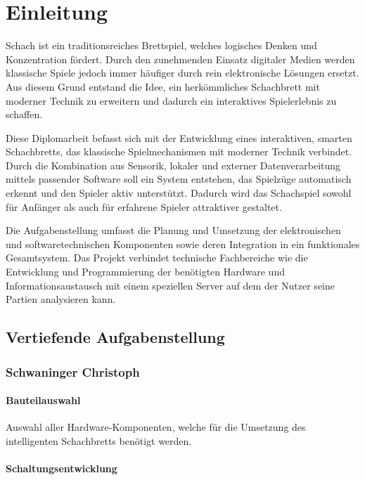 
\chapter{Einleitung}

Schach ist ein traditionsreiches Brettspiel, welches logisches Denken und Konzentration fördert. Durch den zunehmenden 
Einsatz digitaler Medien werden klassische Spiele jedoch immer häufiger durch rein elektronische Lösungen ersetzt. Aus 
diesem Grund entstand die Idee, ein herkömmliches Schachbrett mit moderner Technik zu erweitern und dadurch ein 
interaktives Spielerlebnis zu schaffen.

Diese Diplomarbeit befasst sich mit der Entwicklung eines interaktiven, smarten Schachbretts, das klassische 
Spielmechanismen mit moderner Technik verbindet. Durch die Kombination aus Sensorik, lokaler und externer 
Datenverarbeitung mittels passender Software soll ein System entstehen, das Spielzüge automatisch erkennt und den Spieler 
aktiv unterstützt. Dadurch wird das Schachspiel sowohl für Anfänger als auch für erfahrene Spieler attraktiver gestaltet.

Die Aufgabenstellung umfasst die Planung und Umsetzung der elektronischen und softwaretechnischen Komponenten sowie 
deren Integration in ein funktionales Gesamtsystem. Das Projekt verbindet technische Fachbereiche wie die Entwicklung 
und Programmierung der benötigten Hardware und Informationsaustausch mit einem speziellen Server auf dem der Nutzer 
seine Partien analysieren kann.

\section{Vertiefende Aufgabenstellung}

\subsection{Schwaninger Christoph}

\subsubsection{Bauteilauswahl}

Auswahl aller Hardware-Komponenten, welche für die Umsetzung des intelligenten Schachbretts benötigt werden.

\subsubsection{Schaltungsentwicklung}

